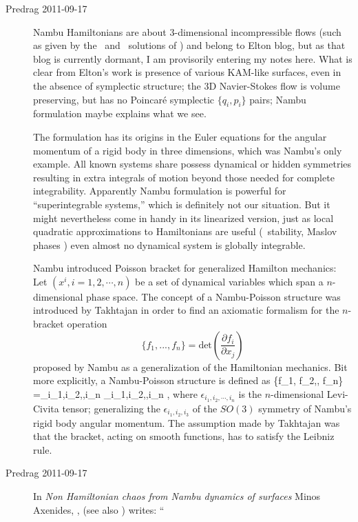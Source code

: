 \begin{description}

\item[Predrag 2011-09-17 ]
Nambu Hamiltonians are about 3-dimensional
incompressible flows (such as given by the \eqv\ and \po\ solutions of
\pCf) and belong to Elton blog, but as that blog is currently dormant, I
am provisorily entering my notes here. What is clear from Elton's work is
presence of various KAM-like surfaces, even in the absence of symplectic
structure; the 3D Navier-Stokes flow is volume preserving, but has no
Poincar\'e symplectic $\{q_i,p_i\}$ pairs; Nambu formulation maybe
explains what we see.

The formulation has its origins in the Euler equations for the angular
momentum of a rigid body in three dimensions, which was Nambu's only
example. All known systems share possess dynamical or hidden symmetries
resulting in extra integrals of motion beyond those needed for complete
integrability. Apparently  Nambu formulation is powerful for
``superintegrable systems,'' which is definitely not our situation.
But it might nevertheless come in handy in its linearized version, just as
local quadratic approximations to Hamiltonians are useful (\po\ stability,
Maslov phases \etc) even almost no dynamical system is globally integrable.

Nambu introduced Poisson bracket for generalized Hamilton
mechanics: Let $(x^i,i=1,2,\cdots, n)$ be a set of dynamical variables
which span a $n$-dimensional phase space. The concept of a Nambu-Poisson
structure was introduced by Takhtajan in order to find an
axiomatic formalism for the $n$-bracket operation
\[
\{f_1, . . . , f_n\} =
\mbox{det} \left( \frac{\partial f_{i}}{\partial x_{j} } \right)
\]
proposed by Nambu as a generalization of the Hamiltonian
mechanics.
Bit more explicitly, a Nambu-Poisson structure is defined as
\beq
\{f_1, f_2,\cdots, f_n\} =\sum_{i_1,i_2,\cdots,i_n}
\epsilon_{i_1,i_2,\cdots,i_n} 
\cdots {},
where $\epsilon_{i_1,i_2,\cdots,i_n}$ is the $n$-dimensional Levi-Civita
tensor; generalizing the  $\epsilon_{i_1,i_2,i_3}$ of the $SO(3)$
symmetry of Nambu's rigid body angular momentum. The assumption made by
Takhtajan was that the bracket, acting on smooth functions, has to
satisfy the Leibniz rule.

\item[Predrag 2011-09-17 ] In
\emph{Non Hamiltonian chaos from Nambu dynamics of surfaces}
Minos Axenides, ,
(see also )
writes: ``


\end{description}
